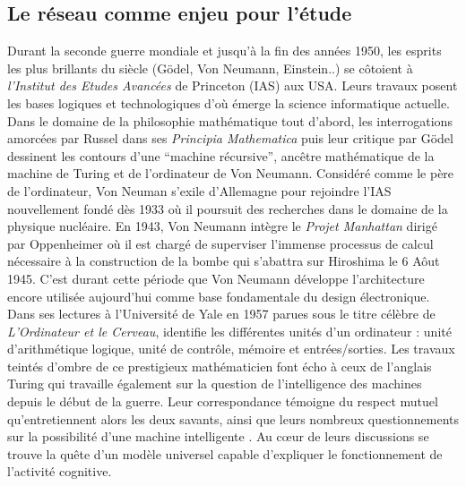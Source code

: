 \subsection[Le réseau comme enjeu pour l{\textquoteright}étude]{Le réseau comme enjeu pour l{\textquoteright}étude}
Durant la seconde guerre mondiale et jusqu{\textquoteright}à la fin des années 1950, les esprits les plus brillants du siècle (G\"odel, Von Neumann, Einstein..) se c\^otoient à \textit{l{\textquoteright}Institut des Etudes Avancées} de Princeton (IAS) aux USA. Leurs travaux posent les bases logiques et technologiques d{\textquoteright}o\`u émerge la science informatique actuelle. Dans le domaine de la philosophie mathématique tout d{\textquoteright}abord, les interrogations amorcées par Russel dans ses \textit{Principia Mathematica }puis leur critique par G\"odel dessinent les contours d{\textquoteright}une {\textquotedblleft}machine récursive{\textquotedblright}, anc\^etre mathématique de la machine de Turing et de l{\textquoteright}ordinateur de Von Neumann. Considéré comme le père de l{\textquoteright}ordinateur, Von Neuman s{\textquoteright}exile d{\textquoteright}Allemagne pour rejoindre l{\textquoteright}IAS nouvellement fondé dès 1933 o\`u il poursuit des recherches dans le domaine de la physique nucléaire. En 1943, Von Neumann intègre le \textit{Projet Manhattan} dirigé par Oppenheimer o\`u il est chargé de superviser l{\textquoteright}immense processus de calcul nécessaire à la construction de la bombe qui s{\textquoteright}abattra sur Hiroshima le 6 A\^out 1945. C{\textquoteright}est durant cette période que Von Neumann développe l{\textquoteright}architecture encore utilisée aujourd{\textquoteright}hui comme base fondamentale du design électronique. Dans ses lectures à l{\textquoteright}Université de Yale en 1957 parues sous le titre célèbre de \textit{L{\textquoteright}Ordinateur et le Cerveau}, \cite{Neumann1958} identifie les différentes unités d{\textquoteright}un ordinateur : unité d{\textquoteright}arithmétique logique, unité de contr\^ole, mémoire et entrées/sorties. Les travaux teintés d{\textquoteright}ombre de ce prestigieux mathématicien font écho à ceux de l{\textquoteright}anglais Turing qui travaille également sur la question de l{\textquoteright}intelligence des machines depuis le début de la guerre. Leur correspondance témoigne du respect mutuel qu{\textquoteright}entretiennent alors les deux savants, ainsi que leurs nombreux questionnements sur la possibilité d{\textquoteright}une machine intelligente \citep{Istrail2013}. Au c{\oe}ur de leurs discussions se trouve la qu\^ete d{\textquoteright}un modèle universel capable d{\textquoteright}expliquer le fonctionnement de l{\textquoteright}activité cognitive.  

